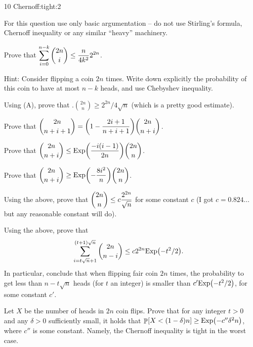 %
{10}%
{Chernoff:tight:2}%
{%
   For this question use only basic argumentation -- do not use
   Stirling's formula, Chernoff inequality or any similar ``heavy''
   machinery.
   \begin{compactenumA}
        \item Prove that $\displaystyle \sum_{i=0}^{n - k} \binom{2n}{i} \leq
        \frac{n}{4k^2} 2^{2n}$.
        
        Hint: Consider flipping a coin $2n$ times. Write down
        explicitly the probability of this coin to have at most $n-k$
        heads, and use Chebyshev inequality.

        \item Using (A), prove that $\Bigg. \binom{2n}{n} \geq
        2^{2n}/4 \sqrt{n}$ (which is a pretty good estimate).

        \item Prove that $\ds \binom{2n}{n + i + 1} = \pth{ 1-
           \frac{2i+1}{n+i+1}} \binom{2n}{n+i}$.

        \item Prove that $\ds \binom{2n}{n + i}\leq \Exp\pth{ \frac{-
              i(i-1)}{2n}} \binom{2n}{n}$.
        
        \item Prove that $\ds \binom{2n}{n + i} \geq \Exp\pth{ -\frac{
              8 i^2}{n}} \binom{2n}{n}$.

        \item Using the above, prove that $\displaystyle \binom{2n}{n} \leq c
        \frac{2^{2n}}{\sqrt{n}}$ for some constant $c$ (I got $c
        =0.824...$ but any reasonable constant will do). 

        \item Using the above, prove that 
        \[
        \sum_{i=t\sqrt{n} + 1}^{(t+1)\sqrt{n}} \binom{2n}{n - i} \leq
        c 2^{2n} \Exp \pth{-t^2/ 2}.
        \]
        In particular, conclude that when flipping fair coin $2n$
        times, the probability to get less than $n - t\sqrt{n}$ heads
        (for $t$ an integer) is smaller than $c' \Exp \pth{-t^2/2}$,
        for some constant $c'$.

        \medskip

        \item Let $X$ be the number of heads in $2n$ coin flips.
        Prove that for any integer $t > 0$ and any $\delta >0$
        sufficiently small, it holds that
        $\Prob{ X < (1- \delta) n} \geq \Exp \pth{-c''\delta^2 n }$,
        where $c''$ is some constant. Namely, the Chernoff inequality
        is tight in the worst case.
    \end{compactenumA}
 }{}


